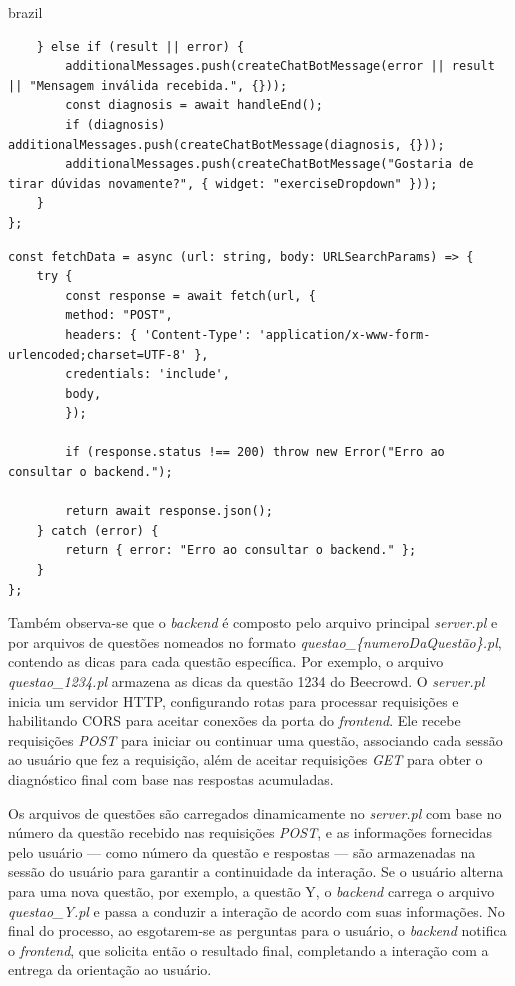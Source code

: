 \begin{otherlanguage*}{brazil}
\begin{lstlisting}
    } else if (result || error) {
        additionalMessages.push(createChatBotMessage(error || result || "Mensagem inválida recebida.", {}));
        const diagnosis = await handleEnd();
        if (diagnosis) additionalMessages.push(createChatBotMessage(diagnosis, {}));
        additionalMessages.push(createChatBotMessage("Gostaria de tirar dúvidas novamente?", { widget: "exerciseDropdown" }));
    }
};
\end{lstlisting}


\begin{lstlisting}
const fetchData = async (url: string, body: URLSearchParams) => {
    try {
        const response = await fetch(url, {
        method: "POST",
        headers: { 'Content-Type': 'application/x-www-form-urlencoded;charset=UTF-8' },
        credentials: 'include',
        body,
        });

        if (response.status !== 200) throw new Error("Erro ao consultar o backend.");

        return await response.json();
    } catch (error) {
        return { error: "Erro ao consultar o backend." };
    }
};
\end{lstlisting}


Também observa-se que o \textit{backend} é composto pelo arquivo principal \textit{server.pl} e por arquivos de questões nomeados no formato \textit{questao\_\{numeroDaQuestão\}.pl}, contendo as dicas para cada questão específica. Por exemplo, o arquivo \textit{questao\_1234.pl} armazena as dicas da questão 1234 do Beecrowd. O \textit{server.pl} inicia um servidor HTTP, configurando rotas para processar requisições e habilitando CORS para aceitar conexões da porta do \textit{frontend}. Ele recebe requisições \textit{POST} para iniciar ou continuar uma questão, associando cada sessão ao usuário que fez a requisição, além de aceitar requisições \textit{GET} para obter o diagnóstico final com base nas respostas acumuladas.

Os arquivos de questões são carregados dinamicamente no \textit{server.pl} com base no número da questão recebido nas requisições \textit{POST}, e as informações fornecidas pelo usuário — como número da questão e respostas — são armazenadas na sessão do usuário para garantir a continuidade da interação. Se o usuário alterna para uma nova questão, por exemplo, a questão Y, o \textit{backend} carrega o arquivo \textit{questao\_Y.pl} e passa a conduzir a interação de acordo com suas informações. No final do processo, ao esgotarem-se as perguntas para o usuário, o \textit{backend} notifica o \textit{frontend}, que solicita então o resultado final, completando a interação com a entrega da orientação ao usuário.


\end{otherlanguage*}
